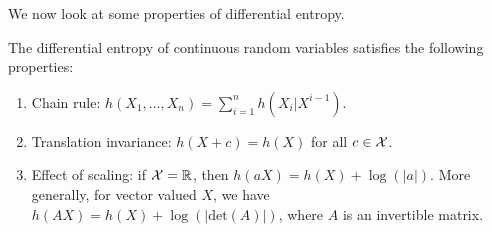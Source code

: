             We now look at some properties of differential entropy. 
            \begin{proposition}
                \label{prop:differential-entropy} 
                The differential entropy of continuous random variables satisfies the following properties: 
                \begin{enumerate}[label=(\alph*)]
                    \item Chain rule: $h(X_1, \ldots, X_n) = \sum_{i=1}^n h(X_i|X^{i-1})$. 
                    \item Translation invariance: $h(X+c) = h(X)$ for all $c \in \mathcal{X}$. 
                    \item Effect of scaling: if $\mathcal{X} = \mathbb{R}$, then $h(aX) = h(X) + \log(|a|)$. More generally, for vector valued $X$, we have $h(AX) = h(X) + \log(|\text{det}(A)|)$, where $A$ is an invertible matrix. 
                \end{enumerate}
            \end{proposition}

